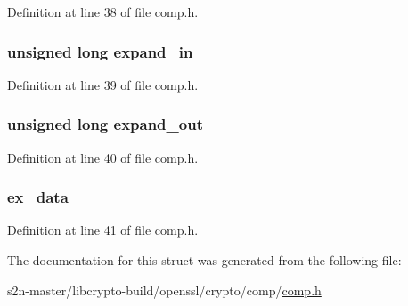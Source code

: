 Definition at line 38 of file comp.\+h.

\subsubsection[{\texorpdfstring{expand\+\_\+in}{expand_in}}]{\setlength{\rightskip}{0pt plus 5cm}unsigned long expand\+\_\+in}\hypertarget{structcomp__ctx__st_a81c59ddb803ee0b98d2e7142bbd388a6}{}\label{structcomp__ctx__st_a81c59ddb803ee0b98d2e7142bbd388a6}


Definition at line 39 of file comp.\+h.

\subsubsection[{\texorpdfstring{expand\+\_\+out}{expand_out}}]{\setlength{\rightskip}{0pt plus 5cm}unsigned long expand\+\_\+out}\hypertarget{structcomp__ctx__st_a32fcdc165a84c8e8b8857933456e14e5}{}\label{structcomp__ctx__st_a32fcdc165a84c8e8b8857933456e14e5}


Definition at line 40 of file comp.\+h.

\subsubsection[{\texorpdfstring{ex\+\_\+data}{ex_data}}]{ ex\+\_\+data}\hypertarget{structcomp__ctx__st_ac3e4fd59d6ee44a81f3a58114613c1e2}{}\label{structcomp__ctx__st_ac3e4fd59d6ee44a81f3a58114613c1e2}


Definition at line 41 of file comp.\+h.



The documentation for this struct was generated from the following file\+:\begin{DoxyCompactItemize}
\item 
s2n-\/master/libcrypto-\/build/openssl/crypto/comp/\hyperlink{crypto_2comp_2comp_8h}{comp.\+h}\end{DoxyCompactItemize}
